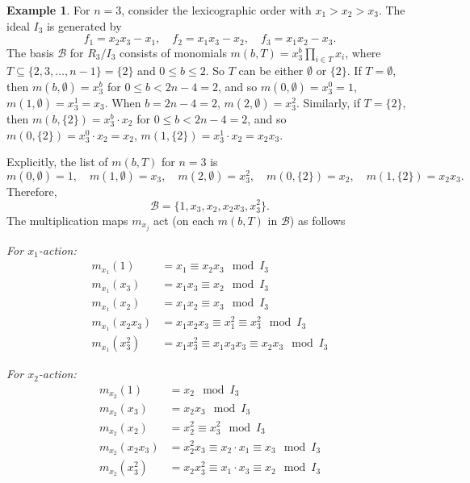 \documentclass[11pt]{amsart}
\theoremstyle{plain}
\theoremstyle{definition}
\newtheorem{ex}[theorem]{Example}
\theoremstyle{remark}
\begin{document}
\begin{ex} \label{eq:permutation-matrices}
	For \( n = 3 \), consider the lexicographic order with \( x_1 > x_2 > x_3 \). The ideal \( I_3 \) is generated by
	\[
	f_1 = x_2x_3 - x_1, \quad f_2 = x_1x_3 - x_2, \quad f_3 = x_1x_2 - x_3.
	\]
	The basis \( \mathcal{B} \) for \( R_3 / I_3 \) consists of monomials \( m(b, T) = \displaystyle x_3^b \prod_{i \in T} x_i \), where \( T \subseteq \{2, 3, \dots, n-1\} = \{2\} \) and \( 0 \leq b \leq 2 \). So \( T \) can be either \( \emptyset \) or \( \{2\} \). If \( T = \emptyset \), then \( m(b, \emptyset) = x_3^b \) for \( 0 \leq b < 2n-4 = 2 \), and so \( m(0, \emptyset) = x_3^0 = 1 \), \( m(1, \emptyset) = x_3^1 = x_3 \).  When \( b = 2n-4 = 2 \), \( m(2, \emptyset) = x_3^2 \). Similarly, if \( T = \{2\} \), then \( m(b, \{2\}) = x_3^b \cdot x_2 \) for \( 0 \leq b < 2n-4 = 2 \), and so \( m(0, \{2\}) = x_3^0 \cdot x_2 = x_2 \), \( m(1, \{2\}) = x_3^1 \cdot x_2 = x_2x_3 \).
	 
	 Explicitly, the list of \( m(b, T) \) for \( n = 3 \) is
	\[
	m(0, \emptyset) = 1, \quad m(1, \emptyset) = x_3, \quad m(2, \emptyset) = x_3^2,\quad m(0, \{2\}) = x_2, \quad m(1, \{2\}) = x_2x_3.
	\]
	Therefore, 
	\[
	\mathcal{B} = \{1, x_3, x_2, x_2x_3, x_3^2\}.
	\]
	The multiplication maps \( m_{x_j} \) act (on each \( m(b, T) \) in \(\mathcal{B}\)) as follows
	
	\noindent \textit{For \(x_1 \)-action:}
		\begin{align*}
			m_{x_1}(1) & = x_1 \equiv x_2x_3 \mod I_3\\
		 	m_{x_1}(x_3) & = x_1x_3 \equiv x_2 \mod I_3 \\
		 	m_{x_1}(x_2) & = x_1x_2 \equiv x_3 \mod I_3 \\
		 	m_{x_1}(x_2x_3) & = x_1x_2x_3 \equiv x_1^2 \equiv x_3^2 \mod I_3 \\
		 	m_{x_1}(x_3^2) & = x_1x_3^2 \equiv x_1x_3x_3 \equiv x_2x_3 \mod I_3 
		\end{align*}
	
	\noindent \textit{For \( x_2 \)-action:}
		\begin{align*}
			m_{x_2}(1) & = x_2 \mod I_3 \\
			m_{x_2}(x_3) & = x_2x_3 \mod I_3 \\
			m_{x_2}(x_2) & = x_2^2 \equiv x_3^2 \mod I_3 \\
			m_{x_2}(x_2x_3) & = x_2^2x_3 \equiv x_2 \cdot x_1 \equiv x_3 \mod I_3 \\
			m_{x_2}(x_3^2) & = x_2x_3^2 \equiv x_1 \cdot x_3 \equiv x_2 \mod I_3
		\end{align*}
	

\end{ex}
\end{document}

